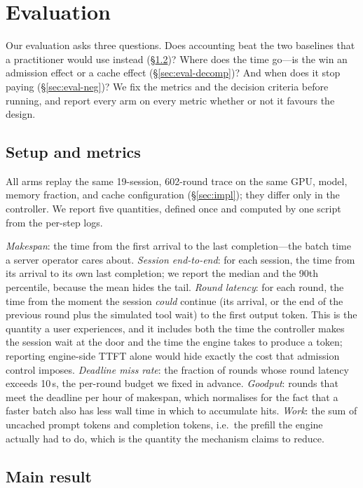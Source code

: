 \section{Evaluation}
\label{sec:eval}

Our evaluation asks three questions. Does accounting beat the two baselines that a
practitioner would use instead (\S\ref{sec:eval-main})? Where does the time go---is the win
an admission effect or a cache effect (\S\ref{sec:eval-decomp})? And when does it stop
paying (\S\ref{sec:eval-neg})? We fix the metrics and the decision criteria before running,
and report every arm on every metric whether or not it favours the design.

\subsection{Setup and metrics}
\label{sec:eval-setup}

All arms replay the same 19-session, 602-round trace on the same GPU, model, memory
fraction, and cache configuration (\S\ref{sec:impl}); they differ only in the controller.
We report five quantities, defined once and computed by one script from the per-step logs.

\emph{Makespan}: the time from the first arrival to the last completion---the batch time a
server operator cares about. \emph{Session end-to-end}: for each session, the time from its
arrival to its own last completion; we report the median and the 90th percentile, because
the mean hides the tail. \emph{Round latency}: for each round, the time from the moment the
session \emph{could} continue (its arrival, or the end of the previous round plus the
simulated tool wait) to the first output token. This is the quantity a user experiences,
and it includes both the time the controller makes the session wait at the door and the
time the engine takes to produce a token; reporting engine-side TTFT alone would hide
exactly the cost that admission control imposes. \emph{Deadline miss rate}: the fraction of
rounds whose round latency exceeds 10\,s, the per-round budget we fixed in advance.
\emph{Goodput}: rounds that meet the deadline per hour of makespan, which normalises for
the fact that a faster batch also has less wall time in which to accumulate hits.
\emph{Work}: the sum of uncached prompt tokens and completion tokens, i.e.\ the prefill the
engine actually had to do, which is the quantity the mechanism claims to reduce.

\subsection{Main result}
\label{sec:eval-main}

